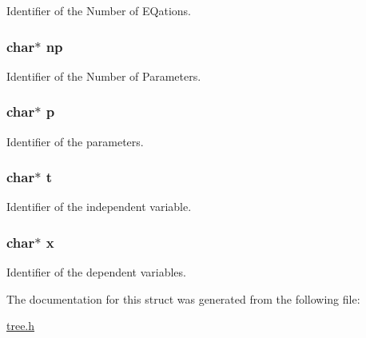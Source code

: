 Identifier of the Number of E\-Qations. 

\hypertarget{structFunc_ac5e9e8f42513fbf549dcde4107b633d0}{
\subsubsection[{np}]{\setlength{\rightskip}{0pt plus 5cm}char$\ast$ np}}\label{structFunc_ac5e9e8f42513fbf549dcde4107b633d0}


Identifier of the Number of Parameters. 

\hypertarget{structFunc_aaa1ebe818ec1c763a776cc580551f3e6}{
\subsubsection[{p}]{\setlength{\rightskip}{0pt plus 5cm}char$\ast$ p}}\label{structFunc_aaa1ebe818ec1c763a776cc580551f3e6}


Identifier of the parameters. 

\hypertarget{structFunc_a21feba301403a65090791a94f26c9d92}{
\subsubsection[{t}]{\setlength{\rightskip}{0pt plus 5cm}char$\ast$ t}}\label{structFunc_a21feba301403a65090791a94f26c9d92}


Identifier of the independent variable. 

\hypertarget{structFunc_a87d9da60be62fb1a74b56404c392bf74}{
\subsubsection[{x}]{\setlength{\rightskip}{0pt plus 5cm}char$\ast$ x}}\label{structFunc_a87d9da60be62fb1a74b56404c392bf74}


Identifier of the dependent variables. 



The documentation for this struct was generated from the following file\-:\begin{DoxyCompactItemize}
\item 
\hyperlink{tree_8h}{tree.\-h}\end{DoxyCompactItemize}
